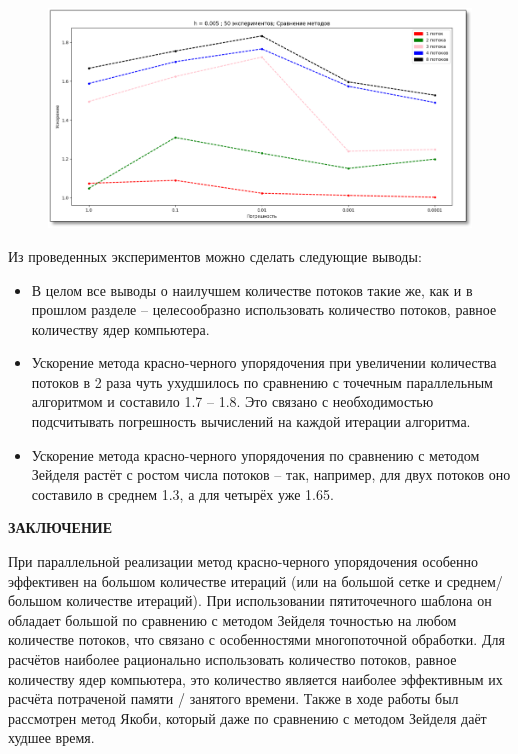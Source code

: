 \documentclass[a4paper, 14pt]{extreport}
\newcommand{\likechapterheading}[1]{
	\begin{center}
		\textbf{\MakeUppercase{#1}}
	\end{center}
	}
\newcommand{\likechapter}[1]{
	\likechapterheading{#1}
	\addcontentsline{toc}{likechapter}{\MakeUppercase{#1}}}
\begin{document}
	\begin{landscape}
		\begin{figure}[h]
			\begin{center}
				\includegraphics[width=0.9\linewidth]{ch2_3}
				\label{i2_8}
			\end{center}
		\end{figure}
	\end{landscape}
	
	Из проведенных экспериментов можно сделать следующие выводы:
		\begin{itemize}
		\item В целом все выводы о наилучшем количестве потоков такие же, как и в прошлом разделе – целесообразно использовать количество потоков, равное количеству ядер компьютера.
		\item Ускорение метода красно-черного упорядочения при увеличении количества потоков в 2 раза чуть ухудшилось по сравнению с точечным параллельным алгоритмом и составило 1.7 – 1.8. Это связано с необходимостью подсчитывать погрешность вычислений на каждой итерации алгоритма.
		\item Ускорение метода красно-черного упорядочения по сравнению с методом Зейделя растёт с ростом числа потоков – так, например, для двух потоков оно составило в среднем 1.3, а для четырёх уже 1.65.
	\end{itemize}
	
\newpage
\likechapter{Заключение}
При параллельной реализации метод красно-черного упорядочения особенно эффективен на большом количестве итераций (или на большой сетке и среднем/большом количестве итераций). При использовании пятиточечного шаблона он обладает большой по сравнению с методом Зейделя точностью на любом количестве потоков, что связано с особенностями многопоточной обработки. Для расчётов наиболее рационально использовать количество потоков, равное количеству ядер компьютера, это количество является наиболее эффективным их расчёта потраченой памяти / занятого времени. Также в ходе работы был рассмотрен метод Якоби, который даже по сравнению с методом Зейделя даёт худшее время.
\end{document}

